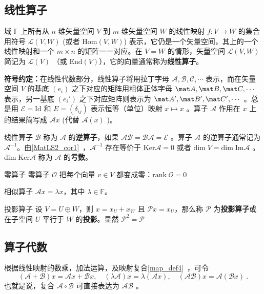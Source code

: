 
\subsection{线性算子}\label{LiOper_sub4}
域 $\mathbb{F}$ 上所有从 $n$ 维矢量空间 $V$ 到 $m$ 维矢量空间 $W$ 的线性映射 $f:V\rightarrow W$ 的集合用符号 $\mathcal{L}(V,W)$ (或者 $\mathrm{Hom}(V,W)$) 表示，它仍是一个矢量空间，其上的一个线性映射和一个 $m\times n$ 的矩阵一一对应。在 $V=W$ 的情形，矢量空间 $\mathcal{L}(V,W)$ 简记为 $\mathcal{L}(V)$ （或 $\mathrm{End}(V)$），它的向量通常称为\textbf{线性算子}。

\textbf{符号约定：}在线性代数部分，线性算子将用拉丁字母 $\mathcal{A,B,C,\cdots}$ 表示，而在矢量空间 $V$ 的基底 $( e_i)$ 之下对应的矩阵用粗体正体字母 $\mat A,\mat B,\mat C,\cdots$ 表示，另一基底 $( e_i')$ 之下对应矩阵则表示为 $\mat A',\mat B',\mat C',\cdots$ 。总是用 $\mathcal{E}=\mathrm{Id}$ 和 $E=(\delta_{ij})$ 表示恒等（单位）映射 $ x\mapsto  x$ 。算子 $\mathcal{A}$ 作用在 $ x$ 上的结果简写成 $\mathcal{A} x$ (代替 $\mathcal{A}( x)$ )。

线性算子 $\mathcal{B}$ 称为 $\mathcal{A}$ 的\textbf{逆算子}，如果 $\mathcal{AB}=\mathcal{BA}=\mathcal{E}$ 。算子 $\mathcal{A}$ 的逆算子通常记为 $\mathcal{A}^{-1}$。由\autoref{MatLS2_cor1}~，$\mathcal{A}^{-1}$ 存在等价于 $\mathrm{Ker}\mathcal{A}=0$ 或者 $\mathrm{dim}\;V=\mathrm{dim\;Im}\mathcal{A}$ 。$\mathrm{dim\;Ker}\mathcal{A}$ 称为 $\mathcal{A}$ 的\textbf{亏数}。
\begin{example}{零算子}\label{LiOper_ex1}
零算子 $\mathcal{O}$ 把每个向量 $ v\in V$ 都变成零：$\mathrm{rank}\; \mathcal{O}=0$
\end{example}
\begin{example}{相似算子}
$\mathcal{A} x=\lambda x$，其中 $\lambda\in\mathbb{F}$。
\end{example}
\begin{example}{投影算子}
设 $V=U\oplus W$，则 $ x= x_U+ x_W$ 且 $\mathcal{P} x= x_U$，那么称 $\mathcal{P}$ 为\textbf{投影算子}或在子空间 $U$ 平行于 $W$ 的\textbf{投影}。显然 $\mathcal{P}^2=\mathcal{P}$
\end{example}
\subsection{算子代数}\label{LiOper_sub3}
根据线性映射的数乘，加法运算，及映射复合\autoref{map_def4}~，可令
\begin{equation}\label{LiOper_eq1}
(\mathcal{A}+\mathcal{B}) x=\mathcal{A} x+\mathcal{B} x,\quad (\lambda\mathcal A) x=\lambda(\mathcal A x),\quad (\mathcal{AB}) x=\mathcal{A}(\mathcal{B} x)~.
\end{equation}
也就是说，复合 $\mathcal{A\circ B}$ 可直接表达为 $\mathcal{AB}$ 。

